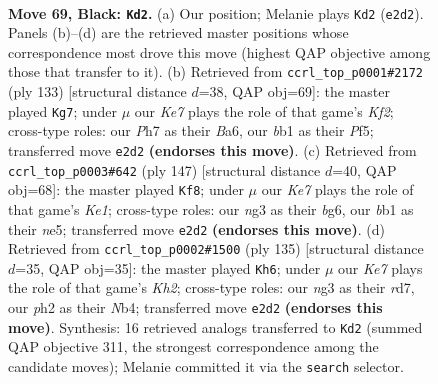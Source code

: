 \documentclass[11pt]{article}
\begin{document}
\clearpage

\begin{figure}[p]\centering
\begin{subfigure}{0.46\textwidth}\centering
\resizebox{\linewidth}{!}{%
\newchessgame
\chessboard[
  setfen={8/2r2p1p/n5p1/4P3/b4Pp1/6N1/4k1KP/1B6 b - - 29 69},
  showmover=false,
  pgfstyle=straightmove, color=movearrow, markmove={e2-d2}
]}
\caption{}
\end{subfigure}\hfill
\begin{subfigure}{0.46\textwidth}\centering
\resizebox{\linewidth}{!}{%
\newchessgame
\chessboard[
  setfen={8/5k2/b2Np3/3pPpp1/3P4/4P1K1/6P1/8 b - - 14 67},
  showmover=false,
  pgfstyle=straightmove, color=movearrow, markmove={f7-g7}
]}
\caption{}
\end{subfigure}
\\[4pt]
\begin{subfigure}{0.46\textwidth}\centering
\resizebox{\linewidth}{!}{%
\newchessgame
\chessboard[
  setfen={4k3/1p6/2p3B1/2PpN1b1/3P4/r7/2K2p1P/1R6 b - - 5 74},
  showmover=false,
  pgfstyle=straightmove, color=movearrow, markmove={e8-f8}
]}
\caption{}
\end{subfigure}\hfill
\begin{subfigure}{0.46\textwidth}\centering
\resizebox{\linewidth}{!}{%
\newchessgame
\chessboard[
  setfen={8/3R3k/2p5/8/1n4pN/2p2pP1/5P1K/2r3B1 b - - 5 68},
  showmover=false,
  pgfstyle=straightmove, color=movearrow, markmove={h7-h6}
]}
\caption{}
\end{subfigure}
\caption{\textbf{Move 69, Black: \texttt{Kd2}.} (a) Our position; Melanie plays \texttt{Kd2} (\texttt{e2d2}). Panels (b)--(d) are the retrieved master positions whose correspondence most drove this move (highest QAP objective among those that transfer to it). (b) Retrieved from \texttt{ccrl\_top\_p0001\#2172} (ply 133) [structural distance $d$=38, QAP obj=69]: the master played \texttt{Kg7}; under $\mu$ our \emph{Ke7} plays the role of that game's \emph{Kf2}; cross-type roles: our \emph{P}h7 as their \emph{B}a6, our \emph{b}b1 as their \emph{P}f5; transferred move \texttt{e2d2} \textbf{(endorses this move)}. (c) Retrieved from \texttt{ccrl\_top\_p0003\#642} (ply 147) [structural distance $d$=40, QAP obj=68]: the master played \texttt{Kf8}; under $\mu$ our \emph{Ke7} plays the role of that game's \emph{Ke1}; cross-type roles: our \emph{n}g3 as their \emph{b}g6, our \emph{b}b1 as their \emph{n}e5; transferred move \texttt{e2d2} \textbf{(endorses this move)}. (d) Retrieved from \texttt{ccrl\_top\_p0002\#1500} (ply 135) [structural distance $d$=35, QAP obj=35]: the master played \texttt{Kh6}; under $\mu$ our \emph{Ke7} plays the role of that game's \emph{Kh2}; cross-type roles: our \emph{n}g3 as their \emph{r}d7, our \emph{p}h2 as their \emph{N}b4; transferred move \texttt{e2d2} \textbf{(endorses this move)}. Synthesis: 16 retrieved analogs transferred to \texttt{Kd2} (summed QAP objective 311, the strongest correspondence among the candidate moves); Melanie committed it via the \texttt{search} selector.}
\label{fig:thought-m137}
\end{figure}
\end{document}
